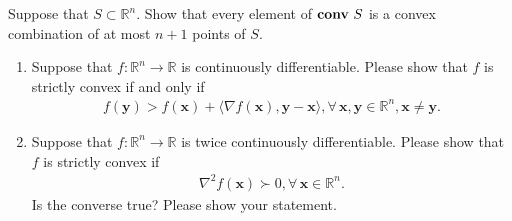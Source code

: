 \documentclass[11pt,letter,notitlepage]{article}
\theoremstyle{definition}
\DeclareMathOperator*{\conv}{\bf conv\,}
\begin{document}
		\newpage
		
		\begin{exercise}
			Suppose that $S \subset \mathbb{R}^n$. Show that every element of $\conv S$ is a convex combination of at most $n + 1$ points of $S$.
		\end{exercise}
		\begin{solution}
			
		\end{solution}
		\newpage
		
		\begin{exercise}
			\begin{enumerate}
				\item Suppose that $f:\mathbb{R}^n \to \mathbb{R}$ is continuously differentiable. Please show that $f$ is strictly convex if and only if 
				\begin{align*}
					f(\mathbf{y})> f(\mathbf{x})+\langle\nabla f(\mathbf{x}),\mathbf{y}-\mathbf{x}\rangle, \forall\, \mathbf{x},\mathbf{y} \in\mathbb{R}^n, \mathbf{x}\not=\mathbf{y}.
				\end{align*}
				\item  Suppose that $f:\mathbb{R}^n \to \mathbb{R}$ is twice continuously differentiable. Please show that $f$ is strictly convex if 
				\begin{align*}
					\nabla^2 f(\mathbf{x}) \succ 0, \forall\, \mathbf{x} \in \mathbb{R}^n.
				\end{align*}
				Is the converse true? Please show your statement.
			\end{enumerate}
		\end{exercise}
		\begin{solution}
			
		\end{solution}
		\newpage
		
		\newpage
		
\end{document}
